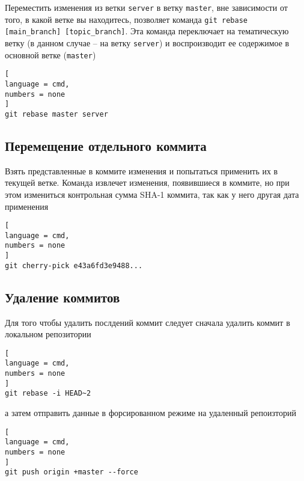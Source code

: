 \documentclass[%
	11pt,
	a4paper,
	utf8,
		]{article}
\begin{document}
Переместить изменения из ветки \texttt{server} в ветку \texttt{master}, вне зависимости от того, в какой ветке вы находитесь, позволяет команда \texttt{git rebase [main\_branch] [topic\_branch]}. Эта команда переключает на тематическую ветку (в данном случае -- на ветку \texttt{server}) и воспроизводит ее содержимое в основной ветке (\texttt{master})

\begin{lstlisting}[
language = cmd,
numbers = none
]
git rebase master server
\end{lstlisting}


\subsection{Перемещение отдельного коммита}

Взять представленные в коммите изменения и попытаться применить их в текущей ветке. Команда извлечет изменения, появившиеся в коммите, но при этом измениться контрольная сумма SHA-1 коммита, так как у него другая дата применения

\begin{lstlisting}[
language = cmd,
numbers = none
]
git cherry-pick e43a6fd3e9488...
\end{lstlisting}


\subsection{Удаление коммитов}

Для того чтобы удалить послдений коммит следует сначала удалить коммит в локальном репозитории

\begin{lstlisting}[
language = cmd,
numbers = none
]
git rebase -i HEAD~2
\end{lstlisting}
а затем отправить данные в форсированном режиме на удаленный репоизторий

\begin{lstlisting}[
language = cmd,
numbers = none
]
git push origin +master --force
\end{lstlisting}




\begin{thebibliography}{99}
	\bibitem{  }{  }
\end{thebibliography}

\end{document}
